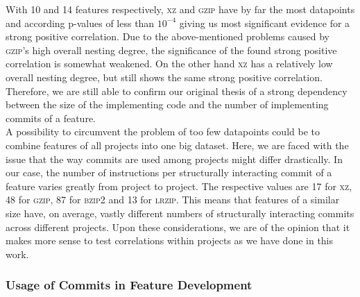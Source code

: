 With 10 and 14 features respectively, \textsc{xz} and \textsc{gzip} have by far the most datapoints and according p-values of less than $10^{-4}$ giving us most significant evidence for a strong positive correlation. 
Due to the above-mentioned problems caused by \textsc{gzip}'s high overall nesting degree, the significance of the found strong positive correlation is somewhat weakened.
On the other hand \textsc{xz} has a relatively low overall nesting degree, but still shows the same strong positive correlation.
Therefore, we are still able to confirm our original thesis of a strong dependency between the size of the implementing code and the number of implementing commits of a feature. \\
A possibility to circumvent the problem of too few datapoints could be to combine features of all projects into one big dataset.  
Here, we are faced with the issue that the way commits are used among projects might differ drastically. 
In our case, the number of instructions per structurally interacting commit of a feature varies greatly from project to project.  
The respective values are 17 for \textsc{xz}, 48 for \textsc{gzip}, 87 for \textsc{bzip2} and 13 for \textsc{lrzip}.  
This means that features of a similar size have, on average, vastly different numbers of structurally interacting commits across different projects. 
Upon these considerations, we are of the opinion that it makes more sense to test correlations within projects as we have done in this work. 

\subsubsection*{Usage of Commits in Feature Development}

